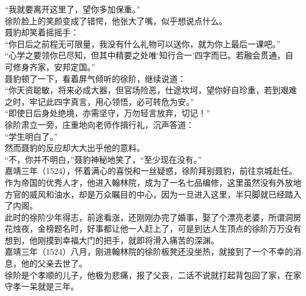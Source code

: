 \begin{multicols}{\theparacolNo}
“我就要离开这里了，望你多加保重。”\\

徐阶脸上的笑颜变成了错愕，他张大了嘴，似乎想说点什么。\\

聂豹却笑着摇摇手：\\

“你日后之前程无可限量，我没有什么礼物可以送你，就为你上最后一课吧。”\\

“心学之要领你已尽知，但其中精要之处唯‘知行合一’四字而已。若融会贯通，自可修身齐家，安邦定国。”\\

聂豹顿了一下，看着屏气倾听的徐阶，继续说道：\\

“你天资聪敏，将来必成大器，但官场险恶，仕途坎坷，望你好自珍重，若到艰难之时，牢记此四字真言，用心领悟，必可转危为安。”\\

“即使日后身处绝境，亦需坚守，万勿轻言放弃，切记！”\\

徐阶肃立一旁，庄重地向老师作揖行礼，沉声答道：\\

“学生明白了。”\\

然而聂豹的反应却大大出乎他的意料。\\

“不，你并不明白，”聂豹神秘地笑了，“至少现在没有。”\\

嘉靖三年（1524），怀着满心的喜悦和一丝疑惑，徐阶拜别聂豹，前往京城赴任。\\

作为帝国的优秀人才，他进入翰林院，成为了一名七品编修，这里虽然没有外放地方官的威风和油水，却是万众瞩目的中心，因为一旦进入这里，半只脚就已经踏入了内阁。\\

此时的徐阶少年得志，前途看涨，还刚刚办完了婚事，娶了个漂亮老婆，所谓洞房花烛夜，金榜题名时，好事都让他一人赶上了，可是到达人生顶点的徐阶万万没有想到，他刚摸到幸福大门的把手，就即将滑入痛苦的深渊。\\

嘉靖三年（1524）八月，刚进翰林院的徐阶板凳还没坐热，就接到了一个不幸的消息，他的父亲去世了。\\

徐阶是个孝顺的儿子，他极为悲痛，报了父丧，二话不说就打起背包回了家，在家守孝一呆就是三年。\\


\end{multicols}
